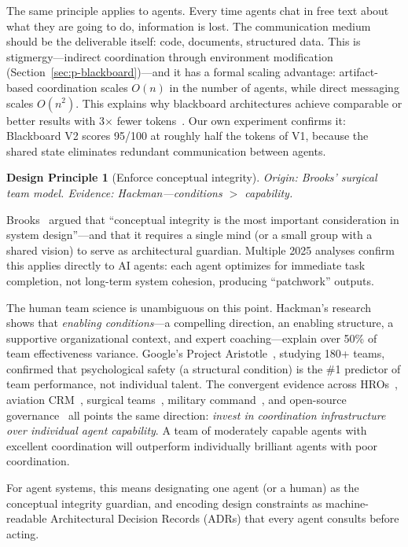 \documentclass{article}
\newtheorem{principle}{Design Principle}
\begin{document}
The same principle applies to agents. Every time agents chat in free text about what
they are going to do, information is lost. The communication medium should be the
deliverable itself: code, documents, structured data. This is stigmergy---indirect
coordination through environment modification
(Section~\ref{sec:p-blackboard})---and it has a formal scaling advantage: artifact-based
coordination scales $O(n)$ in the number of agents, while direct messaging scales
$O(n^2)$. This explains why blackboard architectures achieve comparable or better results
with 3$\times$ fewer tokens~\citep{lbmas2025}. Our own experiment confirms it: Blackboard
V2 scores 95/100 at roughly half the tokens of V1, because the shared state eliminates
redundant communication between agents.

\begin{principle}[Enforce conceptual integrity]
\emph{Origin}: Brooks' surgical team model.
\emph{Evidence}: Hackman---conditions $>$ capability.
\end{principle}

Brooks~\citep{brooks1975mythical} argued that ``conceptual integrity is the most
important consideration in system design''---and that it requires a single mind (or a
small group with a shared vision) to serve as architectural guardian. Multiple 2025
analyses confirm this applies directly to AI agents: each agent optimizes for immediate
task completion, not long-term system cohesion, producing ``patchwork'' outputs.

The human team science is unambiguous on this point. Hackman's
research~\citep{hackman2002leading} shows that \emph{enabling conditions}---a compelling
direction, an enabling structure, a supportive organizational context, and expert
coaching---explain over 50\% of team effectiveness variance. Google's Project
Aristotle~\citep{duhigg2016google}, studying 180+ teams, confirmed that psychological
safety (a structural condition) is the \#1 predictor of team performance, not individual
talent. The convergent evidence across HROs~\citep{weick2015managing}, aviation
CRM~\citep{helmreich1999crm}, surgical teams~\citep{edmondson1999psychological},
military command~\citep{mcchrystal2015team}, and open-source
governance~\citep{raymond1999cathedral} all points the same direction: \emph{invest in
coordination infrastructure over individual agent capability}. A team of moderately
capable agents with excellent coordination will outperform individually brilliant agents
with poor coordination.

For agent systems, this means designating one agent (or a human) as the conceptual
integrity guardian, and encoding design constraints as machine-readable Architectural
Decision Records (ADRs) that every agent consults before acting.
\end{document}
